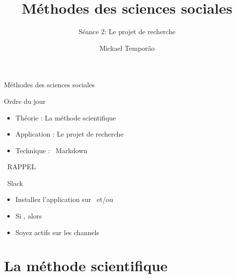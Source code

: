 \documentclass[10pt]{beamer}
\title{Méthodes des sciences sociales}
\subtitle{Séance 2: Le projet de recherche}
\author{Mickael Temporão}
\institute{\faTwitter~$@$mickaeltemporao}
\date{}
\begin{document}
\maketitle

\begin{frame}{Méthodes des sciences sociales}
    \begin{block}{Ordre du jour}
        \begin{itemize}
            \item Théorie : La méthode scientifique
            \item Application : Le projet de recherche
            \item Technique : \faMarkdown~Markdown
        \end{itemize}
    \end{block}
\end{frame}

\begin{frame}{\faExclamationTriangle~RAPPEL}
        \begin{block}{\faSlack~Slack}
            \begin{itemize}[<+->]
                \item Installez l'application sur \faLaptop~et/ou \faMobile
                \item Si \faAt, alors \faReply
                \item Soyez actifs sur les \faHashtag channels
            \end{itemize}
        \end{block}
\end{frame}

\section{La méthode scientifique}
\end{document}
